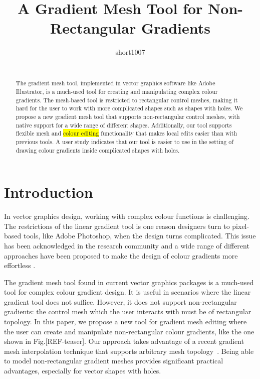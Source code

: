\documentclass{egpubl}
\title[Non-rectangular gradient mesh tool]
{A Gradient Mesh Tool for Non-Rectangular Gradients}
\author[short1007]
{\parbox{\textwidth}{\centering short1007}
	\\
	{\parbox{\textwidth}{\centering } }
}
\begin{document}
	
	
	\maketitle
	
	\begin{abstract}
		The gradient mesh tool, implemented in vector graphics software like Adobe Illustrator, is a much-used tool for creating and manipulating complex colour gradients. The mesh-based tool is restricted to rectangular control meshes, making it hard for the user to work with more complicated shapes such as shapes with holes. We propose a new gradient mesh tool that supports non-rectangular control meshes, with native support for a wide range of different shapes. Additionally, our tool supports flexible mesh and \colorbox{yellow}{colour editing} functionality that makes local edits easier than with previous tools. A user study indicates that our tool is easier to use in the setting of drawing colour gradients inside complicated shapes with holes.
		
		\begin{classification} %
		\end{classification}
		
	\end{abstract}
	
	\section{Introduction}
	\label{sec:intro}
	
	In vector graphics design, working with complex colour functions is challenging. The restrictions of the linear gradient tool is one reason designers turn to pixel-based tools, like Adobe Photoshop, when the design turns complicated. This issue has been acknowledged in the research community and a wide range of different approaches have been proposed to make the design of colour gradients more effortless \cite{Orzan:2008,Lopez-Moreno:2013, Vergne:2012, Shao:2012}.
	
	The gradient mesh tool found in current vector graphics packages is a much-used tool for complex colour gradient design.	It is useful in scenarios where the linear gradient tool does not suffice. However, it does not support non-rectangular gradients: the control mesh which the user interacts with must be of rectangular topology. In this paper, we propose a new tool for gradient mesh editing where the user can create and manipulate non-rectangular colour gradients, like the one shown in Fig.[REF-teaser]. Our approach takes advantage of a recent gradient mesh interpolation technique that supports arbitrary mesh topology~\cite{Lieng:2016}. Being able to model non-rectangular gradient meshes provides significant practical advantages, especially for vector shapes with holes.
	
\end{document}
